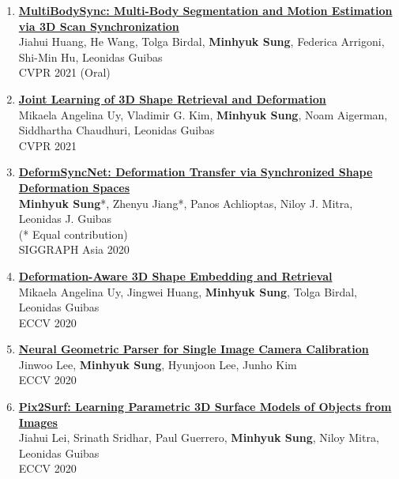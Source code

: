 \documentclass[letterpaper,10pt]{article} %
\newcommand{\blankline}{\quad\pagebreak[2]}
\begin{document}
{\begin{enumerate}
\item \label{cvpr21_2}
\href{https://cg.cs.tsinghua.edu.cn/people/~huangjh/publication/multibodysync/}{\textbf{MultiBodySync: Multi-Body Segmentation and Motion Estimation via 3D Scan Synchronization}}\\
Jiahui Huang, He Wang, Tolga Birdal, \textbf{Minhyuk Sung}, Federica Arrigoni, Shi-Min Hu, Leonidas Guibas\\
CVPR 2021 (Oral)\\
\blankline

\item \label{cvpr21_1}
\href{https://joint-retrieval-deformation.github.io/}{\textbf{Joint Learning of 3D Shape Retrieval and Deformation}}\\
Mikaela Angelina Uy, Vladimir G. Kim, \textbf{Minhyuk Sung}, Noam Aigerman, Siddhartha Chaudhuri, Leonidas Guibas\\
CVPR 2021\\
\blankline

\item \label{siggraphasia20}
\href{https://mhsung.github.io/papers/deform-sync-net.html}{\textbf{DeformSyncNet: Deformation Transfer via Synchronized Shape Deformation Spaces}}\\
\textbf{Minhyuk Sung}*, Zhenyu Jiang*, Panos Achlioptas, Niloy J. Mitra, Leonidas J. Guibas\\
(* Equal contribution)\\
SIGGRAPH Asia 2020\\
\blankline

\item \label{eccv20_4}
\href{https://deformscan2cad.github.io/}{\textbf{Deformation-Aware 3D Shape Embedding and Retrieval}}\\
Mikaela Angelina Uy, Jingwei Huang, \textbf{Minhyuk Sung}, Tolga Birdal, Leonidas Guibas\\
ECCV 2020\\
\blankline

\item \label{eccv20_3}
\href{https://arxiv.org/abs/2007.11855}{\textbf{Neural Geometric Parser for Single Image Camera Calibration}}\\
Jinwoo Lee, \textbf{Minhyuk Sung}, Hyunjoon Lee, Junho Kim\\
ECCV 2020\\
\blankline

\item \label{eccv20_2}
\href{https://geometry.stanford.edu/projects/pix2surf/}{\textbf{Pix2Surf: Learning Parametric 3D Surface Models of Objects from Images}}\\
Jiahui Lei, Srinath Sridhar, Paul Guerrero, \textbf{Minhyuk Sung}, Niloy Mitra, Leonidas Guibas\\
ECCV 2020\\
\blankline


\end{enumerate}}
\end{document}
